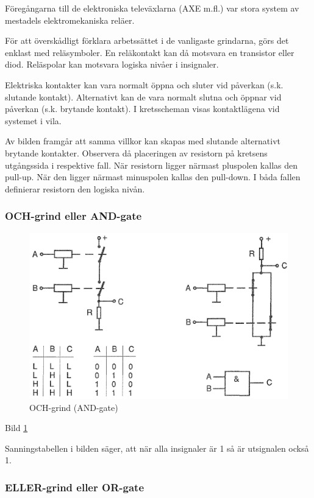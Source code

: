 Föregångarna till de elektroniska televäxlarna (AXE m.fl.) var stora system av
mestadels elektromekaniska reläer.

För att överskådligt förklara arbetssättet i de vanligaste grindarna, görs det
enklast med reläsymboler. En reläkontakt kan då motsvara en transistor eller
diod. Reläspolar kan motsvara logiska nivåer i insignaler.

Elektriska kontakter kan vara normalt öppna och sluter vid påverkan (s.k.
slutande kontakt). Alternativt kan de vara normalt slutna och öppnar vid
påverkan (s.k. brytande kontakt). I kretsscheman visas kontaktlägena vid
systemet i vila.

Av bilden framgår att samma villkor kan skapas med slutande alternativt brytande
kontakter. Observera då placeringen av resistorn på kretsens utgångssida i
respektive fall. När resistorn ligger närmast pluspolen kallas den pull-up. När
den ligger närmast minuspolen kallas den pull-down. I båda fallen definierar
resistorn den logiska nivån.

\subsubsection{OCH-grind eller AND-gate}

\begin{figure}
\includegraphics[width=\textwidth]{images/bild_2_2-37.png}
\caption{OCH-grind (AND-gate)}
\label{fig:BildII2-37}
\end{figure}

Bild \ref{fig:BildII2-37}

Sanningstabellen i bilden säger, att när alla insignaler är 1 så är utsignalen
också 1.

\subsubsection{ELLER-grind eller OR-gate}

